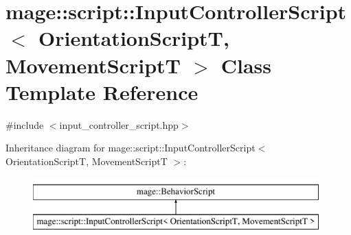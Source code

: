 \hypertarget{classmage_1_1script_1_1_input_controller_script}{}\section{mage\+:\+:script\+:\+:Input\+Controller\+Script$<$ Orientation\+ScriptT, Movement\+ScriptT $>$ Class Template Reference}
\label{classmage_1_1script_1_1_input_controller_script}


{\ttfamily \#include $<$input\+\_\+controller\+\_\+script.\+hpp$>$}

Inheritance diagram for mage\+:\+:script\+:\+:Input\+Controller\+Script$<$ Orientation\+ScriptT, Movement\+ScriptT $>$\+:\begin{figure}[H]
\begin{center}
\leavevmode
\includegraphics[height=2.000000cm]{classmage_1_1script_1_1_input_controller_script}
\end{center}
\end{figure}
